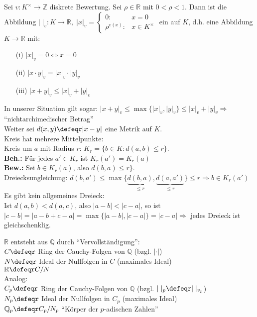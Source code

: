\begin{Bem} 
Sei $v: K^{\times} \to \mathbb{Z}$ diskrete Bewertung.
Sei $\rho \in \mathbb{R}$ mit $0 < \rho < 1$.
Dann ist die Abbildung $|\;|_v: K \to \mathbb{R}, \; |x|_v = \begin{cases}0: & x
= 0 \\\rho^{v(x)}: & x \in K^{\times}\end{cases}$ ein
 auf $K$, d.h. eine Abbildung $K \to
\mathbb{R}$ mit:
\begin{enumerate}
  \item[(i)] $|x|_v = 0 \Leftrightarrow x = 0$
  \item[(ii)] $|x \cdot y|_v = |x|_v \cdot |y|_v$
  \item[(iii)] $|x + y|_v \leq |x|_v + |y|_v$
\end{enumerate}
In unserer Situation gilt sogar: $|x + y|_v \leq \max\{|x|_v,|y|_v\} \leq |x|_v
+ |y|_v \Rightarrow$ ``nichtarchimedischer Betrag''\\
Weiter sei $d(x,y) \defeqr|x - y|$ eine Metrik auf $K$.\\
Kreis hat mehrere Mittelpunkte:\\
Kreis um $a$ mit Radius $r$: $K_r = \{b \in K: d(a,b) \leq r\}$.\\
\textbf{Beh.:} Für jedes $a' \in K_r$ ist $K_r(a') = K_r(a)$\\
\textbf{Bew.:} Sei $b \in K_r(a)$, also $d(b,a) \leq r\}$.\\
Dreiecksungleichung: $d(b,a') \leq \max\{\underset{\leq
r}{\underbrace{d(b,a)}},\underset{\leq r}{\underbrace{d(a,a')}}\} \leq r \Rightarrow b \in
K_r(a')$\\
Es gibt kein allgemeines Dreieck:\\
Ist $d(a,b) < d(a,c)$, also $|a-b| < |c-a|$, so ist $|c-b| = |a-b+c-a| =
\max\{|a-b|,|c-a|\} = |c-a| \Rightarrow$ jedes Dreieck ist gleichschenklig.
\end{Bem}

\begin{Eri}
$\mathbb{R}$ entsteht aus $\mathbb{Q}$ durch ``Vervollständigung'':\\
$C \defeqr$ Ring der Cauchy-Folgen von $\mathbb{Q}$ (bzgl. $|\cdot|$)\\
$N \defeqr$ Ideal der Nullfolgen in $C$ (maximales Ideal)\\
$\mathbb{R} \defeqr C/N$\\
Analog:\\
$C_p \defeqr$ Ring der Cauchy-Folgen von $\mathbb{Q}$ (bzgl. $|\;|_p \defeqr
|\;|_{v_p}$)\\
$N_p \defeqr$ Ideal der Nullfolgen in $C_p$ (maximales Ideal)\\
$\mathbb{Q}_p \defeqr C_p/N_p$ ``Körper der $p$-adischen Zahlen''
\end{Eri}

